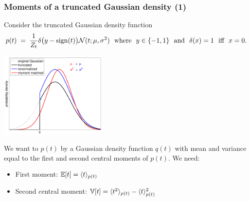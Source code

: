 \begin{frame}
\frametitle{Moments of a truncated Gaussian density (1)}

Consider the truncated Gaussian density function
\[
p(t)\;=\;\frac{1}{Z_t}\delta\big(y-\operatorname{sign}(t)\big){\cal N}(t;\mu,\sigma^2)
\text{\ \ where\ \ }y\in\{-1, 1\}\text{\ \ and\ \ }\delta(x)=1\text{\ \ iff\ \ }x=0.
\]
\centerline{\includegraphics[width=0.4\textwidth]{momtruncgau}}

We want to  $p(t)$ by a Gaussian density function $q(t)$
with mean and variance equal to the first and second central moments
of $p(t)$. We need:
\begin{itemize}
\item First moment: $\mathbb{E}[t] = \langle t\rangle_{p(t)}$
\item Second central moment: $\mathbb{V}[t] = \langle t^2\rangle_{p(t)} - \langle t \rangle^2_{p(t)}$
\end{itemize}

\end{frame}


